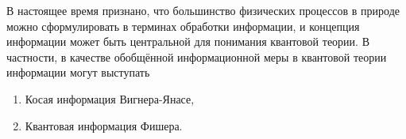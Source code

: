В настоящее время признано,
что большинство физических процессов в природе можно сформулировать в терминах обработки информации,
и концепция информации может быть центральной для понимания квантовой теории\cite{Wheeler2004, Summhammer2004, Frieden2004}.
В частности, в качестве обобщённой информационной меры в квантовой теории информации могут выступать
\begin{enumerate}
  \item Косая информация Вигнера-Янасе\cite{Zeqian2005},
  \item Квантовая информация Фишера\cite{Hyllus2012}.
\end{enumerate}

